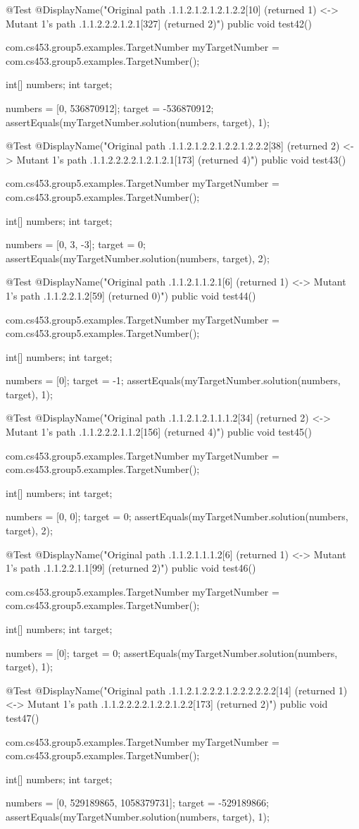 @Test
@DisplayName("Original path .1.1.2.1.2.1.2.1.2.2[10] (returned 1) <-> Mutant 1's path .1.1.2.2.2.1.2.1[327] (returned 2)")
public void test42() {
    com.cs453.group5.examples.TargetNumber myTargetNumber = com.cs453.group5.examples.TargetNumber();

    int[] numbers;
    int target;

    numbers = [0, 536870912];
    target = -536870912;
    assertEquals(myTargetNumber.solution(numbers, target), 1);
}

@Test
@DisplayName("Original path .1.1.2.1.2.2.1.2.2.1.2.2.2[38] (returned 2) <-> Mutant 1's path .1.1.2.2.2.2.1.2.1.2.1[173] (returned 4)")
public void test43() {
    com.cs453.group5.examples.TargetNumber myTargetNumber = com.cs453.group5.examples.TargetNumber();

    int[] numbers;
    int target;

    numbers = [0, 3, -3];
    target = 0;
    assertEquals(myTargetNumber.solution(numbers, target), 2);
}

@Test
@DisplayName("Original path .1.1.2.1.1.2.1[6] (returned 1) <-> Mutant 1's path .1.1.2.2.1.2[59] (returned 0)")
public void test44() {
    com.cs453.group5.examples.TargetNumber myTargetNumber = com.cs453.group5.examples.TargetNumber();

    int[] numbers;
    int target;

    numbers = [0];
    target = -1;
    assertEquals(myTargetNumber.solution(numbers, target), 1);
}

@Test
@DisplayName("Original path .1.1.2.1.2.1.1.1.2[34] (returned 2) <-> Mutant 1's path .1.1.2.2.2.1.1.2[156] (returned 4)")
public void test45() {
    com.cs453.group5.examples.TargetNumber myTargetNumber = com.cs453.group5.examples.TargetNumber();

    int[] numbers;
    int target;

    numbers = [0, 0];
    target = 0;
    assertEquals(myTargetNumber.solution(numbers, target), 2);
}

@Test
@DisplayName("Original path .1.1.2.1.1.1.2[6] (returned 1) <-> Mutant 1's path .1.1.2.2.1.1[99] (returned 2)")
public void test46() {
    com.cs453.group5.examples.TargetNumber myTargetNumber = com.cs453.group5.examples.TargetNumber();

    int[] numbers;
    int target;

    numbers = [0];
    target = 0;
    assertEquals(myTargetNumber.solution(numbers, target), 1);
}

@Test
@DisplayName("Original path .1.1.2.1.2.2.2.1.2.2.2.2.2.2[14] (returned 1) <-> Mutant 1's path .1.1.2.2.2.2.1.2.2.1.2.2[173] (returned 2)")
public void test47() {
    com.cs453.group5.examples.TargetNumber myTargetNumber = com.cs453.group5.examples.TargetNumber();

    int[] numbers;
    int target;

    numbers = [0, 529189865, 1058379731];
    target = -529189866;
    assertEquals(myTargetNumber.solution(numbers, target), 1);
}

